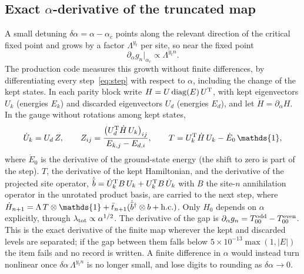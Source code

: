 \documentclass[10pt,a4paper]{article}
\newcommand{\one}{\mathds{1}}
\begin{document}
\subsection{Exact \texorpdfstring{$\alpha$}{alpha}-derivative of the truncated map}\label{sec:tangent}
A small detuning $\delta\alpha=\alpha-\alpha_c$ points along the relevant direction of the critical fixed point and grows by a
factor $\Lambda^{y_t}$ per site, so near the fixed point
\begin{equation}
\partial_\alpha g_n\big|_{\alpha_c}\propto\Lambda^{y_tn}.\label{eq:growth}
\end{equation}
The production code measures this growth without finite differences, by differentiating every step~\eqref{eq:step} with respect to
$\alpha$, including the change of the kept states. In each parity block write $H=U\,{\rm diag}(E)\,U^{\rm T}$, with kept
eigenvectors $U_k$ (energies $E_k$) and discarded eigenvectors $U_d$ (energies $E_d$), and let $\dot H=\partial_\alpha H$. In the
gauge without rotations among kept states,
\begin{equation}
\dot U_k=U_d\,Z,\qquad Z_{ij}=\frac{\big(U_d^{\rm T}\dot H\,U_k\big)_{ij}}{E_{k,j}-E_{d,i}},\qquad
T=U_k^{\rm T}\dot H\,U_k-\dot E_0\,\one,
\label{eq:tangent}
\end{equation}
where $\dot E_0$ is the derivative of the ground-state energy (the shift to zero is part of the step). $T$, the derivative of the kept
Hamiltonian, and the derivative of the projected site operator, $\dot{\bar b}=\dot U_k^{\rm T}B\,U_k+U_k^{\rm T}B\,\dot U_k$ with $B$
the site-$n$ annihilation operator in the unrotated product basis, are carried to the next step, where
$\dot H_{n+1}=\Lambda\,T\otimes\one+\bar t_{n+1}(\dot{\bar b}^\dagger\otimes b+{\rm h.c.})$. Only $H_0$ depends on $\alpha$
explicitly, through $\lambda_{\rm tot}\propto\alpha^{1/2}$. The derivative of the gap is $\partial_\alpha g_n=T^{\rm odd}_{00}-T^{\rm
even}_{00}$. This is the exact derivative of the finite map wherever the kept and discarded levels are separated; if the gap between
them falls below $5\times10^{-13}\max(1,|E|)$ the item fails and no record is written. A finite difference in $\alpha$ would instead
turn nonlinear once $\delta\alpha\,\Lambda^{y_tn}$ is no longer small, and lose digits to rounding as $\delta\alpha\to0$.
\end{document}
